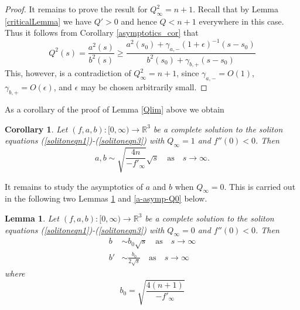 \documentclass{amsart}
\newtheorem{lem}[thm]{Lemma}
\newtheorem{cor}[thm]{Corollary}
\theoremstyle{definition}
\theoremstyle{remark}
\numberwithin{equation}{section}
\newcommand{\R}{\mathbb{R}}  %
\begin{document}
\begin{proof}
It remains to prove the result for $Q^2_{\infty} = n + 1$. Recall that by Lemma \ref{criticalLemma} we have $Q' > 0$ and hence $Q < n + 1$ everywhere in this case. Thus it follows from Corollary \ref{asymptotics_cor} that
\begin{equation*}
Q^2(s) = \frac{a^2(s)}{b^2(s)} \geq \frac{a^2(s_0) + \gamma_{a,-}\left(1+\epsilon\right)^{-1}\left(s-s_0\right) }{b^2(s_0) + \gamma_{b,+}\left(s-s_0\right) }
\end{equation*}
This, however, is a contradiction of $Q^2_{\infty} = n+1$, since $\gamma_{a,-} = O(1)$, $\gamma_{b,+} = O(\epsilon)$, and $\epsilon$ may be chosen arbitrarily small.

\end{proof}

As a corollary of the proof of Lemma \ref{Qlim} above we obtain

\begin{cor}
\label{Qlim1-asymptotic}
Let $(f,a,b): [0,\infty) \rightarrow \R^3$ be a complete solution to the soliton equations (\ref{solitoneqn1})-(\ref{solitoneqn3}) with $Q_\infty = 1$ and $f''(0) < 0$. Then 
\begin{equation*}
a,b \sim \sqrt{\frac{4n}{-f'_\infty}} \sqrt{s} \quad \textrm{as} \quad s \rightarrow \infty.
\end{equation*}
\end{cor}

It remains to study the asymptotics of $a$ and $b$ when $Q_{\infty} = 0$. This is carried out in the following two Lemmas \ref{b-asymp-Q0} and \ref{a-asymp-Q0} below.

\begin{lem}
\label{b-asymp-Q0}
Let $(f,a,b): [0,\infty) \rightarrow \R^3$ be a complete solution to the soliton equations (\ref{solitoneqn1})-(\ref{solitoneqn3}) with $Q_\infty = 0$ and $f''(0) < 0$. Then 
\begin{align}
\label{b_asymp_Q0}
b &\sim b_0 \sqrt{s} \quad \textrm{as} \quad s \rightarrow \infty \\ \nonumber
b' &\sim \frac{b_0}{2\sqrt{s}} \quad \textrm{as} \quad s \rightarrow \infty
\end{align}
where 
\begin{equation*}
b_0 = \sqrt{ \frac{4(n+1)}{-f'_\infty}}
\end{equation*}
\end{lem}
\end{document}
